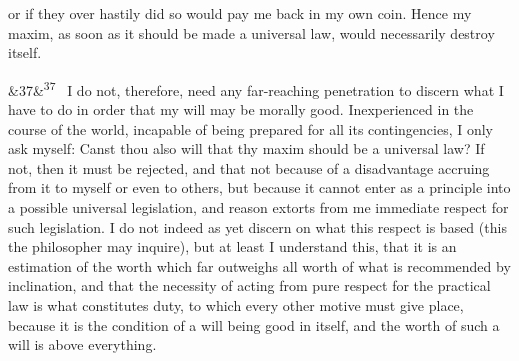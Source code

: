 \documentclass[12pt]{article}
\newcommand{\para}[1][]{\par\noindent\ifx&#1&\else\textsuperscript{\footnotesize #1}~\fi}
\begin{document}
or if they over hastily did so would pay me back in my own coin. Hence my maxim, as soon as it should be made a universal law, would necessarily destroy itself.

\para[37] I do not, therefore, need any far-reaching penetration to discern what I have to do in order that my will may be morally good. Inexperienced in the course of the world, incapable of being prepared for all its contingencies, I only ask myself: Canst thou also will that thy maxim should be a universal law? If not, then it must be rejected, and that not because of a disadvantage accruing from it to myself or even to others, but because it cannot enter as a principle into a possible universal legislation, and reason extorts from me immediate respect for such legislation. I do not indeed as yet discern on what this respect is based (this the philosopher may inquire), but at least I understand this, that it is an estimation of the worth which far outweighs all worth of what is recommended by inclination, and that the necessity of acting from pure respect for the practical law is what constitutes duty, to which every other motive must give place, because it is the condition of a will being good in itself, and the worth of such a will is above everything.
\end{document}
